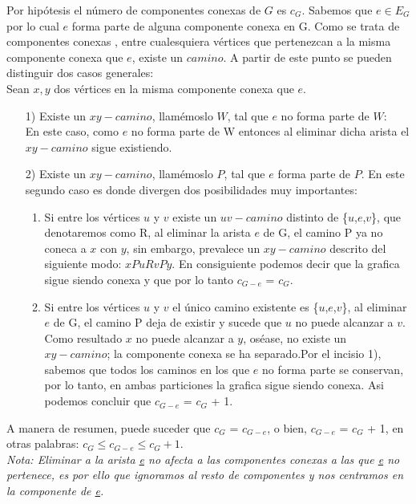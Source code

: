 \documentclass[12pt]{article}
\begin{document}
Por hipótesis el número de componentes conexas de $G$ es $c_G$. Sabemos que $e \in E_G$ por lo cual $e$ forma parte de alguna componente conexa en G. Como se trata de componentes conexas , entre cualesquiera vértices que pertenezcan a la misma componente conexa que $e$,  existe un $camino$. A partir de este punto se pueden distinguir dos casos generales:\\

Sean $x,y$ dos vértices en la misma componente conexa que $e$.
\begin{enumerate}
 	\item [1)] Existe un $xy-camino$, llamémoslo  $W$, tal que $e$ no forma parte de $W$:\\
	En este caso, como $e$ no forma parte de W entonces al eliminar dicha arista el $xy-camino$ sigue existiendo.
	\item [2)]Existe un $xy-camino$, llamémoslo  $P$, tal que $e$ forma parte de $P$. En este segundo caso es donde divergen dos posibilidades muy 				importantes:
	\begin{enumerate}	
		\item Si entre los vértices $u$ y $v$ existe un $uv-camino$ distinto de \{$u$,$e$,$v$\}, que denotaremos como R, al eliminar la arista $e$ de G, el 	camino P ya no coneca a $x$ con $y$, sin embargo, prevalece un $xy-camino$ descrito del siguiente modo: $xPuRvPy$. En 	consiguiente podemos decir que la grafica sigue siendo conexa y que por lo tanto $c_{G-e}$ = $c_G$.
		
		\item Si entre los vértices $u$ y $v$ el único camino existente es \{$u$,$e$,$v$\}, al eliminar $e$ de G, el camino P deja de 		existir y sucede que $u$ no puede alcanzar a $v$. Como resultado $x$ no puede alcanzar a $y$, oséase, no existe un $xy-camino$; la componente conexa se ha separado.Por el incisio 1), sabemos que todos los caminos en los que $e$ no forma parte se conservan, por lo tanto, en ambas particiones la grafica sigue 	siendo conexa. Asi podemos concluir que $c_{G-e}$ = $c_G$ + 1.
	\end{enumerate}	
\end{enumerate}

A manera de resumen, puede suceder que $c_G$ = $c_{G-e}$, o bien, $c_{G-e}$ = $c_G$ + 1, en otras palabras: $c_G \leq c_{G - e} \leq c_G + 1$.\\

\textit{Nota: Eliminar a la arista \underline{e} no afecta a las componentes conexas a las que \underline{e} no pertenece, es por ello que ignoramos al resto de componentes y nos centramos en la componente de \underline{e}.}
\end{document}
